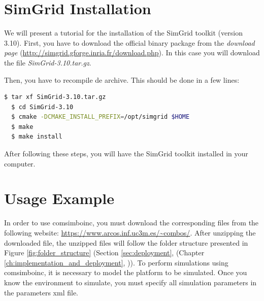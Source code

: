 \begin{appendices}
\begin{itemize}
\begin{itemize}
	\end{itemize}

\end{itemize}


\section{SimGrid Installation}

We will present a tutorial for the installation of the SimGrid toolkit (version 3.10). First, you have to download the official binary package from the \textit{download page} (\url{http://simgrid.gforge.inria.fr/download.php}). In this case you will download the file \textit{SimGrid-3.10.tar.gz}.

Then, you have to recompile de archive. This should be done in a few lines:

\vspace{0.6cm}

\begin{lstlisting}[language=bash]
  $ tar xf SimGrid-3.10.tar.gz
  $ cd SimGrid-3.10
  $ cmake -DCMAKE_INSTALL_PREFIX=/opt/simgrid $HOME
  $ make
  $ make install
\end{lstlisting}

\vspace{0.6cm}

After following these steps, you will have the SimGrid toolkit installed in your computer.


\section{Usage Example}

In order to use \gls{comsimboinc}, you must download the corresponding files from the following website: \url{https://www.arcos.inf.uc3m.es/~combos/}. After unzipping the downloaded file, the unzipped files will follow the folder structure presented in Figure \ref{fig:folder_structure} (Section \ref{sec:deployment}, \textit{} (Chapter \ref{ch:implementation_and_deployment}, \textit{})). To perform simulations using \gls{comsimboinc}, it is necessary to model the platform to be simulated. Once you know the environment to simulate, you must specify all simulation parameters in the parameters \gls{xml} file.


\end{appendices}
